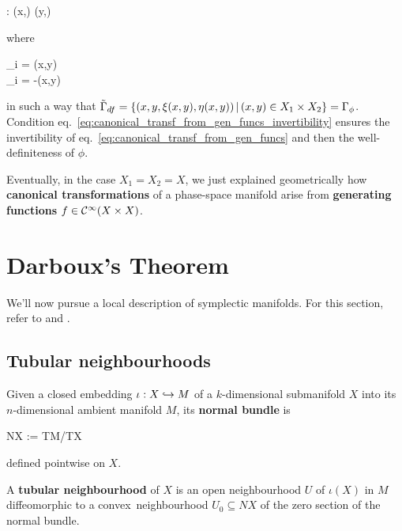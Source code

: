 \documentclass[main.tex]{subfiles}
\begin{document}
\begin{construction}
\begin{enumerate}
\begin{eqalign}
			\phi : (x,\xi) \mapsto (y,\eta)
		\end{eqalign}
		where
		\begin{eqalign}
		\label{eq:canonical_transf_from_gen_funcs}
			\begin{cases}
				\xi_i = (x,y)\\
				\eta_i = -(x,y)
			\end{cases}
		\end{eqalign}
		in such a way that $\tilde\Gamma_{df} = \{(x,y,\xi (x,y),\eta (x,y)) \,|\, (x,y) \in X_1 \times X_2\} = \Gamma_\phi$. Condition eq.~\eqref{eq:canonical_transf_from_gen_funcs_invertibility} ensures the invertibility of eq.~\eqref{eq:canonical_transf_from_gen_funcs} and then the well-definiteness of $\phi$. 
	\end{enumerate}
\end{construction}

Eventually, in the case $X_1 = X_2 = X$, we just explained geometrically how \textbf{canonical transformations} of a phase-space manifold arise from \textbf{generating functions} $f \in \mathcal{C}^\infty(X \times X)$.

\section{Darboux's Theorem}
We'll now pursue a local description of symplectic manifolds. For this section, refer to \cite[Section 1.4]{cannas2005symplectic} and \cite[Section 1.5]{cannas2005symplectic}.

\subsection{Tubular neighbourhoods}
\begin{definition}
	Given a closed embedding ${\iota : X \hookrightarrow M}$ of a $k$-dimensional submanifold $X$ into its $n$-dimensional ambient manifold $M$, its \textbf{normal bundle} is
	\begin{eqalign}
		NX := TM/TX
	\end{eqalign}
	defined pointwise on $X$.
\end{definition}

\begin{definition}
	A \textbf{tubular neighbourhood} of $X$ is an open neighbourhood $U$ of $\iota(X)$ in $M$ diffeomorphic to a convex\footnotemark\ neighbourhood $U_0 \subseteq NX$ of the zero section of the normal bundle.
\end{definition}
\end{document}
